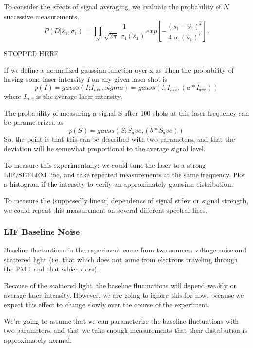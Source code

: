 \documentclass[12pt]{article}
\begin{document}
To consider the effects of signal averaging, we evaluate the
probability of $N$ successive measurements,
\begin{equation}
  P(D \vert \hat{s}_1, \sigma_1) 
  = \prod_{N} \frac{1}{\sqrt{2 \pi} \; \sigma_1(\hat{s}_1)} \,
  exp 
  \left[
    -\frac{(s_1-\hat{s}_1)^2}{4 \; \sigma_1(\hat{s}_1)^2}
  \right] .
\end{equation}

STOPPED HERE

If we define a normalized gaussian function over x as
Then the probability of having some laser intensity $I$ on any given
laser shot is
\begin{equation}
  p(I) = gauss(I; I_{ave},sigma)
       = gauss(I; I_{ave}, (a*I_{ave}))
\end{equation}
where $I_{ave}$ is the average laser intensity.

The probability of measuring a signal S after 100 shots at this laser
frequency can be parameterized as
\begin{equation}
  p(S) = gauss(S; S_ave, (b*S_ave))
\end{equation}
So, the point is that this can be described with two parameters, and
that the deviation will be somewhat proportional to the average signal
level.

To measure this experimentally: we could tune the laser to a strong
LIF/SEELEM line, and take repeated measurements at the same frequency.
Plot a histogram if the intensity to verify an approximately gaussian
distribution.

To measure the (supposedly linear) dependence of signal stdev on
signal strength, we could repeat this measurement on several different
spectral lines.

\subsubsection{LIF Baseline Noise}

Baseline fluctuations in the experiment come from two sources: voltage noise
and scattered light (i.e. that which does not come from electrons traveling
through the PMT and that which does).

Because of the scattered light, the baseline fluctuations will depend weakly
on average laser intensity. However, we are going to ignore this for now,
because we expect this effect to change slowly over the course of the
experiment.

We're going to assume that we can parameterize the baseline fluctuations
with two parameters, and that we take enough measurements that their
distribution is approximately normal.
\end{document}
